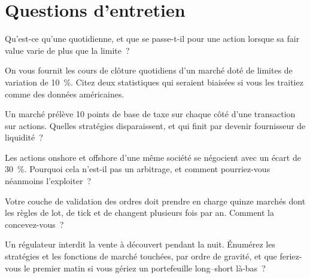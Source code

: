 \section{Questions d'entretien}

\begin{interviewq}\label{iq:m1:asian-and-emerging-equity-markets:1}
Qu'est-ce qu'une  quotidienne, et que se passe-t-il pour une action lorsque
sa fair value varie de plus que la limite~?
\end{interviewq}

\begin{interviewq}\label{iq:m1:asian-and-emerging-equity-markets:2}
On vous fournit les cours de clôture quotidiens d'un marché doté de limites de variation de 10~\%. Citez deux
statistiques qui seraient biaisées si vous les traitiez comme des données américaines.
\end{interviewq}

\begin{interviewq}\label{iq:m1:asian-and-emerging-equity-markets:3}
Un marché prélève 10 points de base de taxe sur chaque côté d'une transaction sur actions. Quelles
stratégies disparaissent, et qui finit par devenir fournisseur de liquidité~?
\end{interviewq}

\begin{interviewq}\label{iq:m1:asian-and-emerging-equity-markets:4}
Les actions onshore et offshore d'une même société se négocient avec un écart de 30~\%. Pourquoi
cela n'est-il pas un arbitrage, et comment pourriez-vous néanmoins l'exploiter~?
\end{interviewq}

\begin{interviewq}\label{iq:m1:asian-and-emerging-equity-markets:5}
Votre couche de validation des ordres doit prendre en charge quinze marchés dont les règles
de lot, de tick et de  changent plusieurs fois par an. Comment la concevez-vous~?
\end{interviewq}

\begin{interviewq}\label{iq:m1:asian-and-emerging-equity-markets:6}
Un régulateur interdit la vente à découvert pendant la nuit. Énumérez les stratégies et les
fonctions de marché touchées, par ordre de gravité, et que feriez-vous le premier
matin si vous gériez un portefeuille long--short là-bas~?
\end{interviewq}
